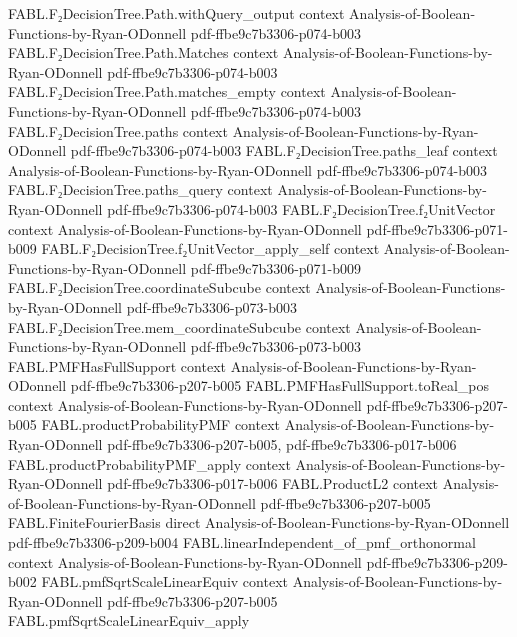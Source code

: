 \begin{theorem}
\proofstep
  {FABL.F₂DecisionTree.Path.withQuery_output}
  {context}
  {Analysis-of-Boolean-Functions-by-Ryan-ODonnell}
  {pdf-ffbe9c7b3306-p074-b003}
\proofstep
  {FABL.F₂DecisionTree.Path.Matches}
  {context}
  {Analysis-of-Boolean-Functions-by-Ryan-ODonnell}
  {pdf-ffbe9c7b3306-p074-b003}
\proofstep
  {FABL.F₂DecisionTree.Path.matches_empty}
  {context}
  {Analysis-of-Boolean-Functions-by-Ryan-ODonnell}
  {pdf-ffbe9c7b3306-p074-b003}
\proofstep
  {FABL.F₂DecisionTree.paths}
  {context}
  {Analysis-of-Boolean-Functions-by-Ryan-ODonnell}
  {pdf-ffbe9c7b3306-p074-b003}
\proofstep
  {FABL.F₂DecisionTree.paths_leaf}
  {context}
  {Analysis-of-Boolean-Functions-by-Ryan-ODonnell}
  {pdf-ffbe9c7b3306-p074-b003}
\proofstep
  {FABL.F₂DecisionTree.paths_query}
  {context}
  {Analysis-of-Boolean-Functions-by-Ryan-ODonnell}
  {pdf-ffbe9c7b3306-p074-b003}
\proofstep
  {FABL.F₂DecisionTree.f₂UnitVector}
  {context}
  {Analysis-of-Boolean-Functions-by-Ryan-ODonnell}
  {pdf-ffbe9c7b3306-p071-b009}
\proofstep
  {FABL.F₂DecisionTree.f₂UnitVector_apply_self}
  {context}
  {Analysis-of-Boolean-Functions-by-Ryan-ODonnell}
  {pdf-ffbe9c7b3306-p071-b009}
\proofstep
  {FABL.F₂DecisionTree.coordinateSubcube}
  {context}
  {Analysis-of-Boolean-Functions-by-Ryan-ODonnell}
  {pdf-ffbe9c7b3306-p073-b003}
\proofstep
  {FABL.F₂DecisionTree.mem_coordinateSubcube}
  {context}
  {Analysis-of-Boolean-Functions-by-Ryan-ODonnell}
  {pdf-ffbe9c7b3306-p073-b003}
\proofstep
  {FABL.PMFHasFullSupport}
  {context}
  {Analysis-of-Boolean-Functions-by-Ryan-ODonnell}
  {pdf-ffbe9c7b3306-p207-b005}
\proofstep
  {FABL.PMFHasFullSupport.toReal_pos}
  {context}
  {Analysis-of-Boolean-Functions-by-Ryan-ODonnell}
  {pdf-ffbe9c7b3306-p207-b005}
\proofstep
  {FABL.productProbabilityPMF}
  {context}
  {Analysis-of-Boolean-Functions-by-Ryan-ODonnell}
  {pdf-ffbe9c7b3306-p207-b005,
    pdf-ffbe9c7b3306-p017-b006}
\proofstep
  {FABL.productProbabilityPMF_apply}
  {context}
  {Analysis-of-Boolean-Functions-by-Ryan-ODonnell}
  {pdf-ffbe9c7b3306-p017-b006}
\proofstep
  {FABL.ProductL2}
  {context}
  {Analysis-of-Boolean-Functions-by-Ryan-ODonnell}
  {pdf-ffbe9c7b3306-p207-b005}
\proofstep
  {FABL.FiniteFourierBasis}
  {direct}
  {Analysis-of-Boolean-Functions-by-Ryan-ODonnell}
  {pdf-ffbe9c7b3306-p209-b004}
\proofstep
  {FABL.linearIndependent_of_pmf_orthonormal}
  {context}
  {Analysis-of-Boolean-Functions-by-Ryan-ODonnell}
  {pdf-ffbe9c7b3306-p209-b002}
\proofstep
  {FABL.pmfSqrtScaleLinearEquiv}
  {context}
  {Analysis-of-Boolean-Functions-by-Ryan-ODonnell}
  {pdf-ffbe9c7b3306-p207-b005}
\proofstep
  {FABL.pmfSqrtScaleLinearEquiv_apply}

\end{theorem}
